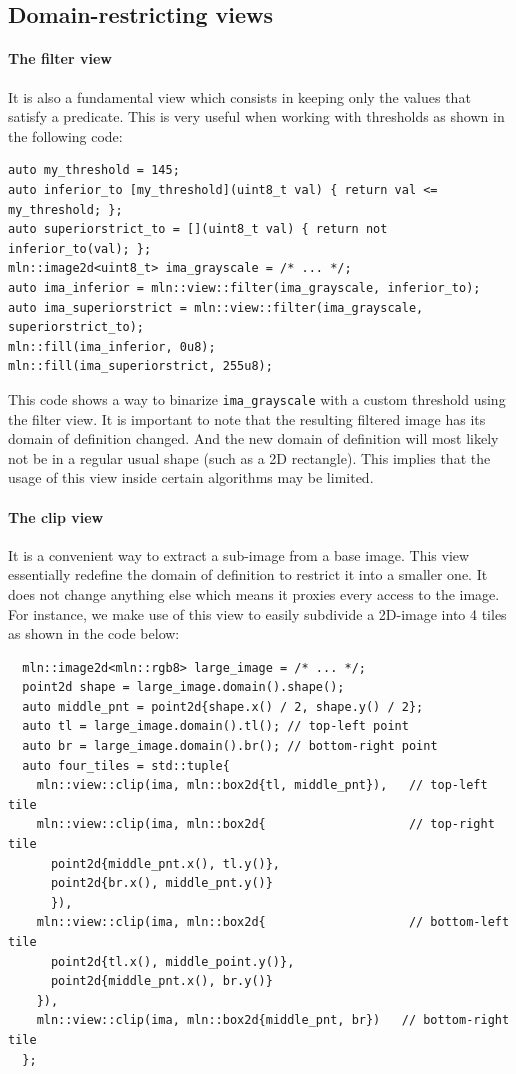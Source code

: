 \subsection{Domain-restricting views}

\paragraph{The filter view} It is also a fundamental view which consists in keeping only the values that satisfy a
predicate. This is very useful when working with thresholds as shown in the following code:
\begin{verbatim}
auto my_threshold = 145;
auto inferior_to [my_threshold](uint8_t val) { return val <= my_threshold; };
auto superiorstrict_to = [](uint8_t val) { return not inferior_to(val); };
mln::image2d<uint8_t> ima_grayscale = /* ... */;
auto ima_inferior = mln::view::filter(ima_grayscale, inferior_to);
auto ima_superiorstrict = mln::view::filter(ima_grayscale, superiorstrict_to);
mln::fill(ima_inferior, 0u8);
mln::fill(ima_superiorstrict, 255u8);
\end{verbatim}
This code shows a way to binarize \texttt{ima\_grayscale} with a custom threshold using the filter view. It is important
to note that the resulting filtered image has its domain of definition changed. And the new domain of definition will
most likely not be in a regular usual shape (such as a 2D rectangle). This implies that the usage of this view inside
certain algorithms may be limited.

\paragraph{The clip view} It is a convenient way to extract a sub-image from a base image. This view essentially
redefine the domain of definition to restrict it into a smaller one. It does not change anything else which means it
proxies every access to the image. For instance, we make use of this view to easily subdivide a 2D-image into 4 tiles as
shown in the code below:
\begin{verbatim}
  mln::image2d<mln::rgb8> large_image = /* ... */;
  point2d shape = large_image.domain().shape();
  auto middle_pnt = point2d{shape.x() / 2, shape.y() / 2};
  auto tl = large_image.domain().tl(); // top-left point
  auto br = large_image.domain().br(); // bottom-right point
  auto four_tiles = std::tuple{
    mln::view::clip(ima, mln::box2d{tl, middle_pnt}),   // top-left tile
    mln::view::clip(ima, mln::box2d{                    // top-right tile
      point2d{middle_pnt.x(), tl.y()},
      point2d{br.x(), middle_pnt.y()}
      }),
    mln::view::clip(ima, mln::box2d{                    // bottom-left tile
      point2d{tl.x(), middle_point.y()},
      point2d{middle_pnt.x(), br.y()}
    }),
    mln::view::clip(ima, mln::box2d{middle_pnt, br})   // bottom-right tile
  };
\end{verbatim}

